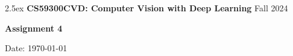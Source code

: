 \documentclass[oneside,11pt,letter]{article}
\newcommand{\myname}{}
\newcommand{\report}{}
\begin{document}

\thispagestyle{empty}
\begin{mdframed}
\baselineskip2.5ex
{\bf CS59300CVD: Computer Vision with Deep Learning}
\hfill
Fall 2024

{\Large
\begin{center}
{\bf \sf Assignment 4}
\end{center}
}

{\bf \myname}
\hfill
Date: \today
\end{mdframed}

\report{}

\end{document}
